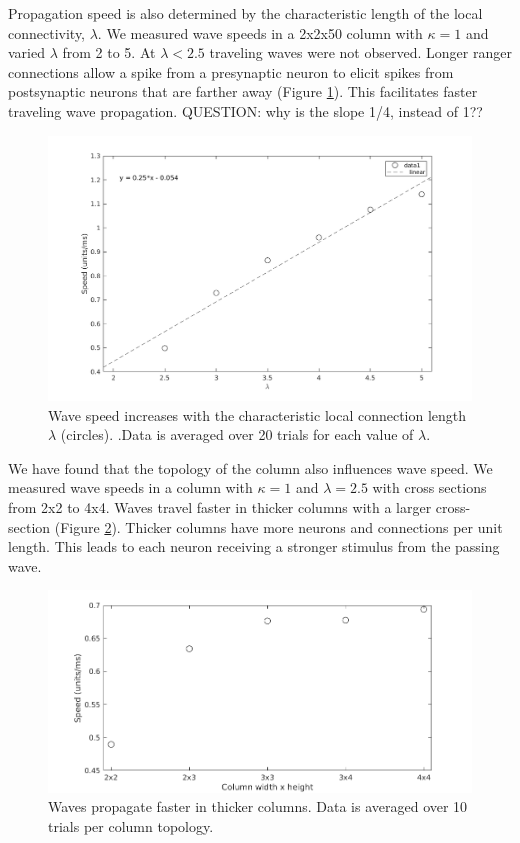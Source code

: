 \documentclass[a4paper,11pt]{article}
\begin{document}
Propagation speed is also determined by the characteristic length of the local connectivity, $\lambda$.
We measured wave speeds in a 2x2x50 column with $\kappa=1$  and varied $\lambda$ from 2 to 5.
At $\lambda<2.5$ traveling waves were not observed.
Longer ranger connections allow a spike from a presynaptic neuron to elicit spikes from postsynaptic neurons that are farther away (Figure \ref{fig:delay_lambda}).
This facilitates faster traveling wave propagation.
QUESTION: why is the slope 1/4, instead of 1??
\begin{figure}[!htb]
 \caption{ Wave speed increases with the characteristic local connection length $\lambda$ (circles). .Data is averaged over 20 trials for each value of $\lambda$.}
 \label{fig:delay_lambda}
 \centering
   \includegraphics[width=\textwidth]{fig/WaveSpeed_Lambda}
\end{figure}

\FloatBarrier

We have found that the topology of the column also influences wave speed. 
We measured wave speeds in a column with $\kappa=1$ and $\lambda=2.5$ with cross sections from 2x2 to 4x4.
Waves travel faster in thicker columns with a larger cross-section (Figure \ref{fig:delay_topology}).
Thicker columns have more neurons and connections per unit length.
This leads to each neuron receiving a stronger stimulus from the passing wave.
\begin{figure}[!htb]
 \caption{ Waves propagate faster in thicker columns. Data is averaged over 10 trials per column topology.}
 \label{fig:delay_topology}
 \centering
   \includegraphics[width=\textwidth]{fig/WaveSpeed_Topology}
\end{figure}
\end{document}
